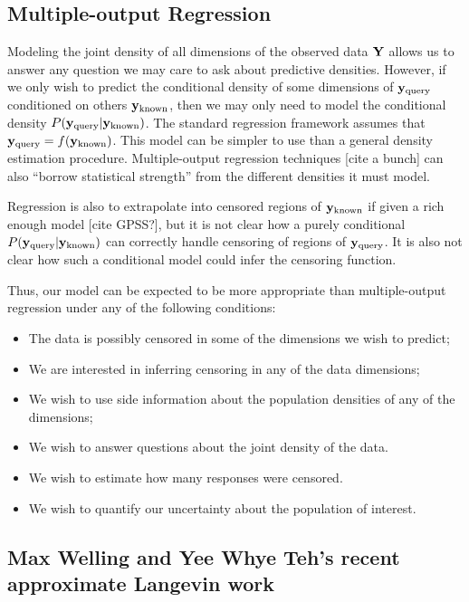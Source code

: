 \documentclass{article}
\begin{document}
\subsection{Multiple-output Regression}

Modeling the joint density of all dimensions of the observed data $\mathbf{Y}$ allows us to answer any question we may care to ask about predictive densities.  However, if we only wish to predict the conditional density of some dimensions of ${\bf{y}}_{\textrm{query}}$ conditioned on others ${\bf{y}}_{\textrm{known}}$, then we may only need to model the conditional density $P( {\bf{y}}_{\textrm{query}} | {\bf{y}}_{\textrm{known}})$.  The standard regression framework assumes that ${\bf{y}}_{\textrm{query}} = f({\bf{y}}_{\textrm{known}})$.  This model can be simpler to use than a general density estimation procedure.  Multiple-output regression techniques [cite a bunch] can also ``borrow statistical strength'' from the different densities it must model.

Regression is also to extrapolate into censored regions of ${\bf{y}}_{\textrm{known}}$ if given a rich enough model [cite GPSS?], but it is not clear how a purely conditional $P( {\bf{y}}_{\textrm{query}} | {\bf{y}}_{\textrm{known}})$ can correctly handle censoring of regions of ${\bf{y}}_{\textrm{query}}$.  It is also not clear how such a conditional model could infer the censoring function.

Thus, our model can be expected to be more appropriate than multiple-output regression under any of the following conditions:
\begin{itemize}
	\item The data is possibly censored in some of the dimensions we wish to predict;
	\item We are interested in inferring censoring in any of the data dimensions;
	\item We wish to use side information about the population densities of any of the dimensions;
	\item We wish to answer questions about the joint density of the data.
	\item We wish to estimate how many responses were censored.
	\item We wish to quantify our uncertainty about the population of interest.
\end{itemize}

\subsection{Max Welling and Yee Whye Teh's recent approximate Langevin work}
\end{document}
